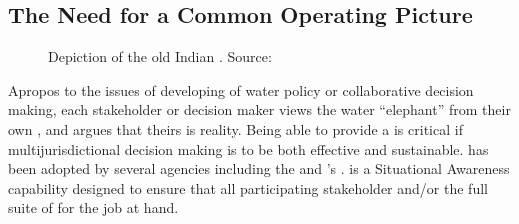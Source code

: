 \documentclass[letterpaper,10pt,english]{sphinxmanual}
\let\sphinxpxdimen\pdfpxdimen\else\newdimen\sphinxpxdimen
\begin{document}
\subsection{The Need for a Common Operating Picture}
\label{\detokenize{requirements/introduction/cop:the-need-for-a-common-operating-picture}}\label{\detokenize{requirements/introduction/cop::doc}}
\begin{figure}[htbp]
\centering
\capstart

\noindent\sphinxincludegraphics[height=500\sphinxpxdimen]{{Blind_men_and_elephant4}.jpg}
\caption{Depiction of the old Indian .
Source: }\label{\detokenize{requirements/introduction/cop:id2}}\end{figure}

\sphinxAtStartPar
Apropos to the issues of developing of water policy or collaborative decision
making, each stakeholder or decision maker views the
water “elephant” from their own , and argues that
theirs is reality. Being able to provide a  is
critical if multi\sphinxhyphen{}jurisdictional decision making is to be both effective and
sustainable. {\hyperref[\detokenize{glossary:term-COP}]{}} has been adopted by several agencies including the {\hyperref[\detokenize{glossary:term-DHS}]{}} and
{\hyperref[\detokenize{glossary:term-NOAA}]{}}’s {\hyperref[\detokenize{glossary:term-NWS}]{}}. {\hyperref[\detokenize{glossary:term-COP}]{}} is a Situational Awareness capability
designed to ensure that
all participating stakeholder and/or  the full suite
of  for the job at hand.
\end{document}
